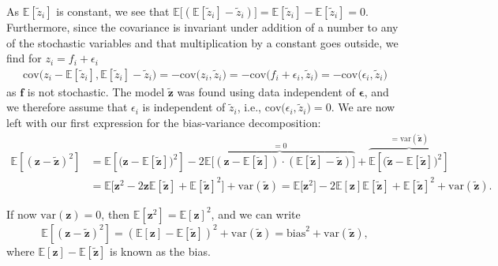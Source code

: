 \documentclass[10pt, a4paper]{article}
\begin{document}
    As \(\mathbb{E}[\widetilde{z}_i]\) is constant, we see that \(\mathbb{E}\big[(\mathbb{E}[\widetilde{z}_i] - \widetilde{z}_i)\big]=\mathbb{E}[\widetilde{z}_i] - \mathbb{E}[\widetilde{z}_i]=0\). Furthermore, since the covariance is invariant under addition of a number to any of the stochastic variables and that multiplication by a constant goes outside, we find for \(z_i=f_i+\epsilon_i\)
    \begin{align*}
        \text{cov}\big(z_i - \mathbb{E}[\widetilde{z}_i],\mathbb{E}[\widetilde{z}_i] - \widetilde{z}_i\big) = -\text{cov}\big(z_i,\widetilde{z}_i\big) = -\text{cov}\big(f_i + \epsilon_i,\widetilde{z}_i\big) = -\text{cov}\big(\epsilon_i,\widetilde{z}_i\big)
    \end{align*}
    as \(\bm{f}\) is not stochastic. The model \(\bm{\widetilde{z}}\) was found using data independent of \(\bm{\epsilon}\), and we therefore assume that \(\epsilon_i\) is independent of \(\widetilde{z}_i\), i.e., \(\text{cov}\big(\epsilon_i,\widetilde{z}_i\big) = 0\). We are now left with our first expression for the bias-variance decomposition:
    \begin{align*}
        \mathbb{E}\left[(\bm{z} - \bm{\widetilde{z}})^2\right] &= \mathbb{E}\left[\big(\bm{z} - \mathbb{E}[\bm{\widetilde{z}}]\big)^2\right] - 2\overbrace{\mathbb{E}\Big[(\bm{z} - \mathbb{E}[\bm{\widetilde{z}}])\cdot(\mathbb{E}[\bm{\widetilde{z}}] - \bm{\widetilde{z}})\Big]}^{ = 0} + \overbrace{\mathbb{E}\left[\big(\bm{\widetilde{z}} - \mathbb{E}[\bm{\widetilde{z}}]\big)^2\right]}^{ = \text{var}(\bm{\widetilde{z}})}
        \\
        &= \mathbb{E}\big[\bm{z}^2 - 2\bm{z}\mathbb{E}[\bm{\widetilde{z}}] + \mathbb{E}[\bm{\widetilde{z}}]^2\big] + \text{var}(\bm{\widetilde{z}}) = \mathbb{E}\big[\bm{z}^2\big] - 2\mathbb{E}[\bm{z}]\mathbb{E}[\bm{\widetilde{z}}] + \mathbb{E}[\bm{\widetilde{z}}]^2 + \text{var}(\bm{\widetilde{z}}).
    \end{align*}
    
    If now \(\text{var}(\bm{z}) = 0\), then \(\mathbb{E}[\bm{z}^2] = \mathbb{E}[\bm{z}]^2\), and we can write
    \begin{equation*}
        \mathbb{E}\left[(\bm{z} - \bm{\widetilde{z}})^2\right] = \left(\mathbb{E}[\bm{z}] - \mathbb{E}[\bm{\widetilde{z}}]\right)^2 + \text{var}(\bm{\widetilde{z}}) = \text{bias}^2 + \text{var}(\bm{\widetilde{z}}),
    \end{equation*}
    where \(\mathbb{E}[\bm{z}] - \mathbb{E}[\bm{\widetilde{z}}]\) is known as the bias.
    
\end{document}
